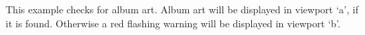 \begin{example}
\end{example}
This example checks for album art. Album art will be displayed in viewport `a', if
it is found. Otherwise a red flashing warning will be displayed in viewport `b'.
